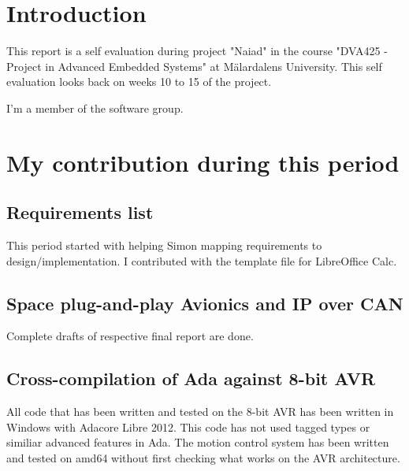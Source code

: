 \section{Introduction}
This report is a self evaluation during project "Naiad" in the course
"DVA425 - Project in Advanced Embedded Systems" at M\"{a}lardalens University.
This self evaluation looks back on weeks 10 to 15 of the project.

I'm a member of the software group.

\section{My contribution during this period}

\subsection{Requirements list}
This period started with helping Simon mapping requirements to
design/implementation. I contributed with the template file for LibreOffice
Calc.

\subsection{Space plug-and-play Avionics and IP over CAN}
Complete drafts of respective final report are done.

\subsection{Cross-compilation of Ada against 8-bit AVR}
All code that has been written and tested on the 8-bit AVR has been written in
Windows with Adacore Libre 2012. This code has not used tagged types or
similiar advanced features in Ada. The motion control system has been
written and tested on amd64 without first checking what works on the AVR
architecture.

